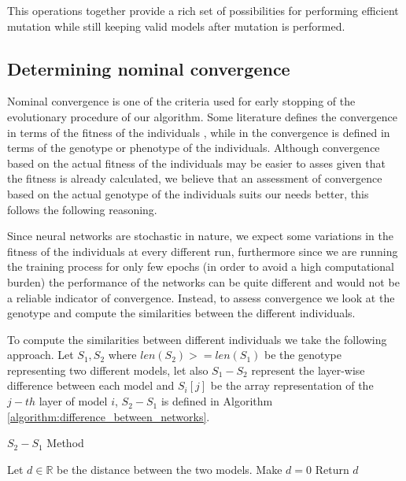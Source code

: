 \documentclass[journal]{IEEEtran}
\begin{document}
This operations together provide a rich set of possibilities for performing efficient mutation while still keeping valid models after mutation is performed. 

\subsection{Determining nominal convergence}
\label{sec:convergence}

Nominal convergence is one of the criteria used for early stopping of the evolutionary procedure of our algorithm. Some literature defines the convergence in terms of the fitness of the individuals \cite{Engelbrecht2007}, while in \cite{Krishnakumar1989} the convergence is defined in terms of the genotype or phenotype of the individuals. Although convergence based on the actual fitness of the individuals may be easier to asses given that the fitness is already calculated, we believe that an assessment of convergence based on the actual genotype of the individuals suits our needs better, this follows the following reasoning.

Since neural networks are stochastic in nature, we expect some variations in the fitness of the individuals at every different run, furthermore since we are running the training process for only few epochs (in order to avoid a high computational burden) the performance of the networks can be quite different and would not be a reliable indicator of convergence. Instead, to assess convergence we look at the genotype and compute the similarities between the different individuals.

To compute the similarities between different individuals we take the following approach. Let $S_1, S_2$ where $len(S_2) >= len(S_1)$ be the genotype representing two different models, let also $S_1 - S_2$ represent the layer-wise difference between each model and $S_i[j]$ be the array representation of the $j-th$ layer of model $i$, $S_2 - S_1$ is defined in Algorithm \ref{algorithm:difference_between_networks}. \\

\begin{algorithm}[!htb]
\caption{$S_2 - S_1$ Method}
\begin{algorithmic}[0]
\State Let $d \in \mathbb{R}$ be the distance between the two models. Make $d = 0$
\EndFor
{}
\EndFor
\State Return $d$
\end{algorithmic}
\label{algorithm:difference_between_networks}
\end{algorithm}
\end{document}

